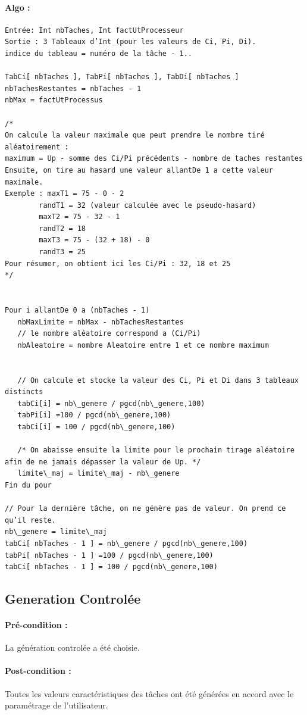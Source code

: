 		\paragraph{Algo :}
			\begin{verbatim}
Entrée: Int nbTaches, Int factUtProcesseur
Sortie : 3 Tableaux d’Int (pour les valeurs de Ci, Pi, Di). 
indice du tableau = numéro de la tâche - 1..

TabCi[ nbTaches ], TabPi[ nbTaches ], TabDi[ nbTaches ]
nbTachesRestantes = nbTaches - 1
nbMax = factUtProcessus 

/*
On calcule la valeur maximale que peut prendre le nombre tiré aléatoirement :
maximum = Up - somme des Ci/Pi précédents - nombre de taches restantes
Ensuite, on tire au hasard une valeur allantDe 1 a cette valeur maximale.
Exemple : maxT1 = 75 - 0 - 2
	    randT1 = 32 (valeur calculée avec le pseudo-hasard)
	    maxT2 = 75 - 32 - 1
	    randT2 = 18
	    maxT3 = 75 - (32 + 18) - 0
	    randT3 = 25
Pour résumer, on obtient ici les Ci/Pi : 32, 18 et 25
*/


Pour i allantDe 0 a (nbTaches - 1)
   nbMaxLimite = nbMax - nbTachesRestantes
   // le nombre aléatoire correspond a (Ci/Pi)
   nbAleatoire = nombre Aleatoire entre 1 et ce nombre maximum


   // On calcule et stocke la valeur des Ci, Pi et Di dans 3 tableaux distincts
   tabCi[i] = nb\_genere / pgcd(nb\_genere,100)
   tabPi[i] =100 / pgcd(nb\_genere,100)
   tabCi[i] = 100 / pgcd(nb\_genere,100)
	        
   /* On abaisse ensuite la limite pour le prochain tirage aléatoire afin de ne jamais dépasser la valeur de Up. */
   limite\_maj = limite\_maj - nb\_genere
Fin du pour

// Pour la dernière tâche, on ne génère pas de valeur. On prend ce qu’il reste.
nb\_genere = limite\_maj
tabCi[ nbTaches - 1 ] = nb\_genere / pgcd(nb\_genere,100)
tabPi[ nbTaches - 1 ] =100 / pgcd(nb\_genere,100)
tabCi[ nbTaches - 1 ] = 100 / pgcd(nb\_genere,100)
			\end{verbatim}

	\subsection{Generation Controlée}  
		\paragraph{Pré-condition :} La génération controlée a été choisie.
		\paragraph{Post-condition :} Toutes les valeurs caractéristiques des tâches ont été générées en accord avec le paramétrage de l’utilisateur.
